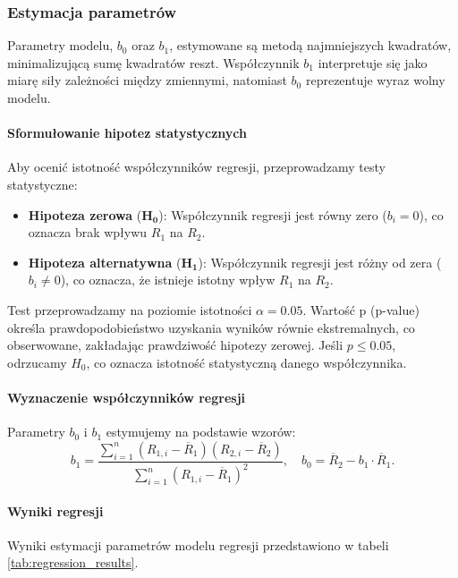 \documentclass[12pt]{article}
\begin{document}
\subsubsection{Estymacja parametrów}

Parametry modelu, \(b_0\) oraz \(b_1\), estymowane są metodą najmniejszych kwadratów, minimalizującą sumę kwadratów reszt. Współczynnik \(b_1\) interpretuje się jako miarę siły zależności między zmiennymi, natomiast \(b_0\) reprezentuje wyraz wolny modelu.


\paragraph{Sformułowanie hipotez statystycznych}
Aby ocenić istotność współczynników regresji, przeprowadzamy testy statystyczne:

\begin{itemize}
    \item \textbf{Hipoteza zerowa} (\(\mathbf{H_0}\)): Współczynnik regresji jest równy zero (\(b_i = 0\)), co oznacza brak wpływu \(R_1\) na \(R_2\).
    \item \textbf{Hipoteza alternatywna} (\(\mathbf{H_1}\)): Współczynnik regresji jest różny od zera (\(b_i \neq 0\)), co oznacza, że istnieje istotny wpływ \(R_1\) na \(R_2\).
\end{itemize}

Test przeprowadzamy na poziomie istotności \(\alpha = 0.05\). Wartość p (p-value) określa prawdopodobieństwo uzyskania wyników równie ekstremalnych, co obserwowane, zakładając prawdziwość hipotezy zerowej. Jeśli \( p \leq 0.05 \), odrzucamy \( H_0 \), co oznacza istotność statystyczną danego współczynnika.


\paragraph{Wyznaczenie współczynników regresji}
Parametry \(b_0\) i \(b_1\) estymujemy na podstawie wzorów:
\[
b_1 = \frac{\sum_{i=1}^n (R_{1,i} - \overline{R}_1)(R_{2,i} - \overline{R}_2)}{\sum_{i=1}^n (R_{1,i} - \overline{R}_1)^2}, \quad
b_0 = \overline{R}_2 - b_1 \cdot \overline{R}_1.
\]

\paragraph{Wyniki regresji}

Wyniki estymacji parametrów modelu regresji przedstawiono w tabeli \ref{tab:regression_results}. 
\end{document}
